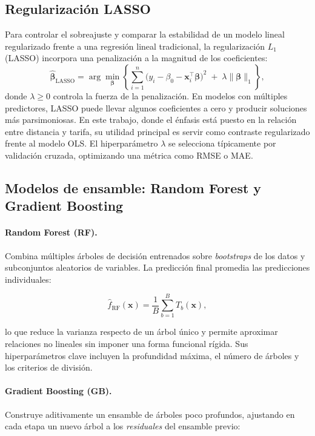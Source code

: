 \documentclass[10pt]{article}
\begin{document}
	\subsection{Regularización LASSO}
	Para controlar el sobreajuste y comparar la estabilidad de un modelo lineal regularizado frente a una regresión lineal tradicional, la regularización $L_1$ (LASSO) incorpora una penalización a la magnitud de los coeficientes:
	\[
	\hat{\boldsymbol{\beta}}_{\text{LASSO}}
	= \arg\min_{\boldsymbol{\beta}} \left\{
	\sum_{i=1}^{n}\bigl(y_i-\beta_0-\mathbf{x}_i^\top\boldsymbol{\beta}\bigr)^2
	\;+\; \lambda \lVert \boldsymbol{\beta}\rVert_1
	\right\},
	\]
	donde $\lambda\ge 0$ controla la fuerza de la penalización. En modelos con múltiples predictores, LASSO puede llevar algunos coeficientes a cero y producir soluciones más parsimoniosas. En este trabajo, donde el énfasis está puesto en la relación entre distancia y tarifa, su utilidad principal es servir como contraste regularizado frente al modelo OLS. El hiperparámetro $\lambda$ se selecciona típicamente por validación cruzada, optimizando una métrica como RMSE o MAE.

	\subsection{Modelos de ensamble: Random Forest y Gradient Boosting}
	\paragraph{Random Forest (RF).} Combina múltiples árboles de decisión entrenados sobre \textit{bootstraps} de los datos y subconjuntos aleatorios de variables. La predicción final promedia las predicciones individuales:

	\[
	\hat{f}_{\text{RF}}(\mathbf{x})=\frac{1}{B}\sum_{b=1}^{B} T_b(\mathbf{x}),
	\]

	lo que reduce la varianza respecto de un árbol único y permite aproximar relaciones no lineales sin imponer una forma funcional rígida. Sus hiperparámetros clave incluyen la profundidad máxima, el número de árboles y los criterios de división.

	\paragraph{Gradient Boosting (GB).} Construye aditivamente un ensamble de árboles poco profundos, ajustando en cada etapa un nuevo árbol a los \textit{residuales} del ensamble previo:
\end{document}
